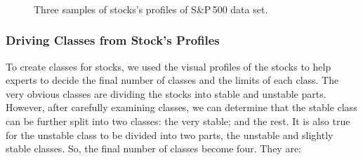 \begin{figure}[!h]
\hfill{\begin{minipage}{\dimexpr \textwidth-2\fboxsep-2\fboxrule}%
        \centering
        \\
        \\
        \\
    \end{minipage}}
    \caption{Three samples of stocks's profiles of S\&P\,500 data set.}
    \label{fig:stockProfiles}
\end{figure}
    
    
    \subsubsection{Driving Classes from Stock's Profiles}
    \label{sec:Driving_Classes_from_Stock_Profiles}
To create classes for stocks, we used the visual profiles of the stocks to help experts to decide the final number of classes and the limits of each class. The very obvious classes are dividing the stocks into stable and unstable parts. However, after carefully examining classes, we can determine that the stable class can be further split into two classes: the very stable; and the rest. It is also true for the unstable class to be divided into two parts, the unstable and slightly stable classes. So, the final number of classes become four. They are:
    
